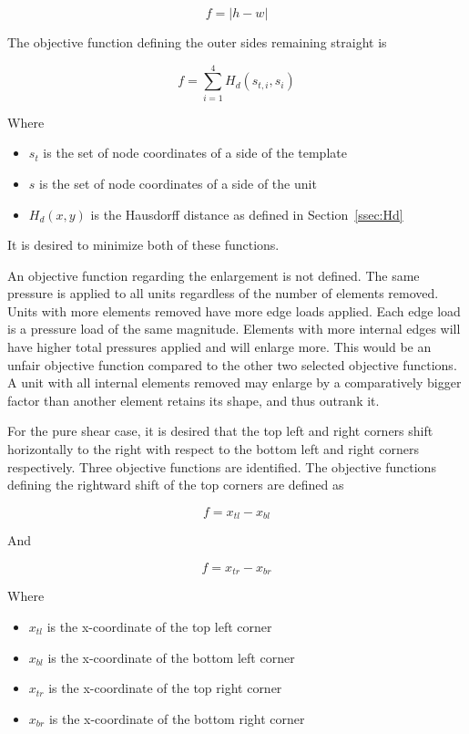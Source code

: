\begin{equation}
	f=\left | h-w \right |
\end{equation}

The objective function defining the outer sides remaining straight is

\begin{equation}
	f=\sum_{i=1}^{4}H_{d}\left ( s_{t,i},s_{i} \right )
\end{equation}

Where

\begin{itemize}
	\item $s_{t}$ is the set of node coordinates of a side of the template
	\item $s$ is the set of node coordinates of a side of the unit
	\item $H_{d}\left ( x,y \right )$ is the Hausdorff distance as defined in Section~\ref{ssec:Hd}
\end{itemize}

It is desired to minimize both of these functions.

An objective function regarding the enlargement is not defined. The same pressure is applied to all units regardless of the number of elements removed. Units with more elements removed have more edge loads applied. Each edge load is a pressure load of the same magnitude. Elements with more internal edges will have higher total pressures applied and will enlarge more. This would be an unfair objective function compared to the other two selected objective functions. A unit with all internal elements removed may enlarge by a comparatively bigger factor than another element retains its shape, and thus outrank it.

For the pure shear case, it is desired that the top left and right corners shift horizontally to the right with respect to the bottom left and right corners respectively. Three objective functions are identified. The objective functions defining the rightward shift of the top corners are defined as

\begin{equation}
	f=x_{tl}-x_{bl}
\end{equation}

And

\begin{equation}
	f=x_{tr}-x_{br}
\end{equation}

Where

\begin{itemize}
	\item $x_{tl}$ is the x-coordinate of the top left corner
	\item $x_{bl}$ is the x-coordinate of the bottom left corner
	\item $x_{tr}$ is the x-coordinate of the top right corner
	\item $x_{br}$ is the x-coordinate of the bottom right corner
\end{itemize}

